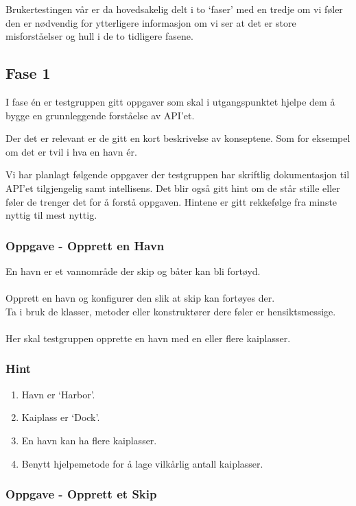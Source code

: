 \documentclass[12pt]{article}
\begin{document}
Brukertestingen vår er da hovedsakelig delt i to `faser' med en tredje om vi føler den er nødvendig for ytterligere informasjon om vi ser at det er store
misforståelser og hull i de to tidligere fasene.

\subsection{Fase 1} 

I fase én er testgruppen gitt oppgaver som skal i utgangspunktet hjelpe dem å bygge en grunnleggende forståelse av API'et. 

Der det er relevant er de gitt en kort beskrivelse av konseptene. Som for eksempel om det er tvil i hva en havn ér.

Vi har planlagt følgende oppgaver der testgruppen har skriftlig dokumentasjon til API'et tilgjengelig samt intellisens.
Det blir også gitt hint om de står stille eller føler de trenger det for å forstå oppgaven. Hintene er gitt rekkefølge fra minste nyttig til mest nyttig.

\subsubsection{Oppgave - Opprett en Havn}

En havn er et vannområde der skip og båter kan bli fortøyd. \\ \\
Opprett en havn og konfigurer den slik at skip kan fortøyes der. \\
Ta i bruk de klasser, metoder eller konstruktører dere føler er hensiktsmessige. \\ \\
Her skal testgruppen opprette en havn med en eller flere kaiplasser.

\subsubsection*{Hint}

\begin{enumerate}
    \item Havn er `Harbor'.
    \item Kaiplass er `Dock'.
    \item En havn kan ha flere kaiplasser.
    \item Benytt hjelpemetode for å lage vilkårlig antall kaiplasser.
\end{enumerate}

\subsubsection{Oppgave - Opprett et Skip}
\end{document}
